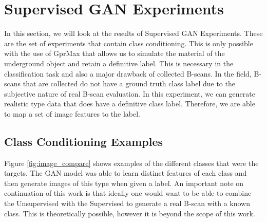 \section{Supervised GAN Experiments}\label{Supervised}
\hspace{0.5in}In this section, we will look at the results of Supervised GAN Experiments. These are the set of experiments that contain class conditioning. This is only possible with the use of GprMax that allows us to simulate the material of the underground object and retain a definitive label. This is necessary in the classification task and also a major drawback of collected B-scans. In the field, B-scans that are collected do not have a ground truth class label due to the subjective nature of real B-scan evaluation. In this experiment, we can generate realistic type data that does have a definitive class label. Therefore, we are able to map a set of image features to the label. 

\subsection{Class Conditioning Examples}
\hspace{0.5in}Figure \ref{fig:image_compare} shows examples of the different classes that were the targets. The GAN model was able to learn distinct features of each class and then generate images of this type when given a label. An important note on continuation of this work is that ideally one would want to be able to combine the Unsupervised with the Supervised to generate a real B-scan with a known class. This is theoretically possible, however it is beyond the scope of this work. 

